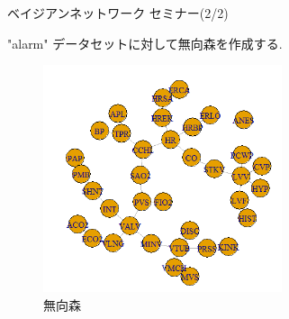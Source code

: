 \documentclass[dvipdfmx]{beamer}
\begin{document}
\begin{frame}{ベイジアンネットワーク セミナー(2/2)}

"alarm" データセットに対して無向森を作成する.

\begin{figure}[H]
\begin{center}
\includegraphics[width=70mm]{data/forest1.png}
\caption{無向森}
\label{TAN}
\end{center}
\end{figure}
\end{frame}
\end{document}
